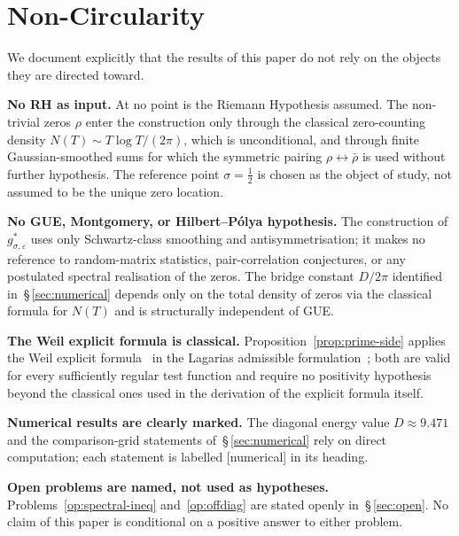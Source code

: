 \documentclass[11pt]{article}
\begin{document}
\section{Non-Circularity}
\label{sec:nocirc}

We document explicitly that the results of this paper do not
rely on the objects they are directed toward.

\textbf{No RH as input.}
At no point is the Riemann Hypothesis assumed.
The non-trivial zeros $\rho$ enter the construction only through
the classical zero-counting density $N(T)\sim T\log T/(2\pi)$,
which is unconditional, and through finite Gaussian-smoothed
sums for which the symmetric pairing $\rho\leftrightarrow\bar\rho$
is used without further hypothesis.
The reference point $\sigma=\tfrac12$ is chosen as the object
of study, not assumed to be the unique zero location.

\textbf{No GUE, Montgomery, or Hilbert--P\'olya hypothesis.}
The construction of $g^*_{\sigma,\varepsilon}$ uses only
Schwartz-class smoothing and antisymmetrisation; it makes no
reference to random-matrix statistics, pair-correlation
conjectures, or any postulated spectral realisation of the
zeros.
The bridge constant $D/2\pi$ identified in~\S\,\ref{sec:numerical}
depends only on the total density of zeros via the classical
formula for $N(T)$ and is structurally independent of GUE.

\textbf{The Weil explicit formula is classical.}
Proposition~\ref{prop:prime-side} applies the Weil explicit
formula~\cite{Weil} in the Lagarias admissible
formulation~\cite{Lagarias}; both are valid for every
sufficiently regular test function and require no positivity
hypothesis beyond the classical ones used in the derivation of
the explicit formula itself.

\textbf{Numerical results are clearly marked.}
The diagonal energy value $D\approx 9.471$ and the
comparison-grid statements of~\S\,\ref{sec:numerical} rely on
direct computation; each statement is labelled [numerical] in
its heading.

\textbf{Open problems are named, not used as hypotheses.}
Problems~\ref{op:spectral-ineq} and~\ref{op:offdiag} are stated
openly in~\S\,\ref{sec:open}.
No claim of this paper is conditional on a positive answer to
either problem.

\end{document}
